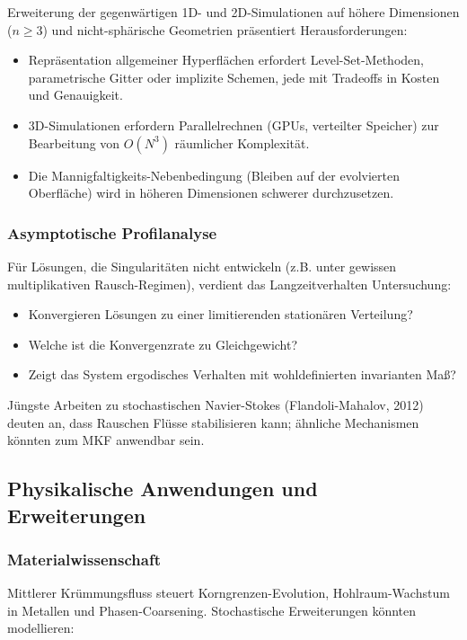 \documentclass[a4paper,12pt]{article}
\theoremstyle{definition}
\begin{document}
Erweiterung der gegenwärtigen 1D- und 2D-Simulationen auf höhere Dimensionen ($n \geq 3$) und nicht-sphärische Geometrien präsentiert Herausforderungen:

\begin{itemize}
	\item Repräsentation allgemeiner Hyperflächen erfordert Level-Set-Methoden, parametrische Gitter oder implizite Schemen, jede mit Tradeoffs in Kosten und Genauigkeit.
	\item 3D-Simulationen erfordern Parallelrechnen (GPUs, verteilter Speicher) zur Bearbeitung von $O(N^3)$ räumlicher Komplexität.
	\item Die Mannigfaltigkeits-Nebenbedingung (Bleiben auf der evolvierten Oberfläche) wird in höheren Dimensionen schwerer durchzusetzen.
\end{itemize}

\subsubsection{Asymptotische Profilanalyse}

Für Lösungen, die Singularitäten nicht entwickeln (z.B. unter gewissen multiplikativen Rausch-Regimen), verdient das Langzeitverhalten Untersuchung:

\begin{itemize}
	\item Konvergieren Lösungen zu einer limitierenden stationären Verteilung?
	\item Welche ist die Konvergenzrate zu Gleichgewicht?
	\item Zeigt das System ergodisches Verhalten mit wohldefinierten invarianten Maß?
\end{itemize}

Jüngste Arbeiten zu stochastischen Navier-Stokes (Flandoli-Mahalov, 2012) deuten an, dass Rauschen Flüsse stabilisieren kann; ähnliche Mechanismen könnten zum MKF anwendbar sein.

\subsection{Physikalische Anwendungen und Erweiterungen}

\subsubsection{Materialwissenschaft}

Mittlerer Krümmungsfluss steuert Korngrenzen-Evolution, Hohlraum-Wachstum in Metallen und Phasen-Coarsening. Stochastische Erweiterungen könnten modellieren:
\end{document}
